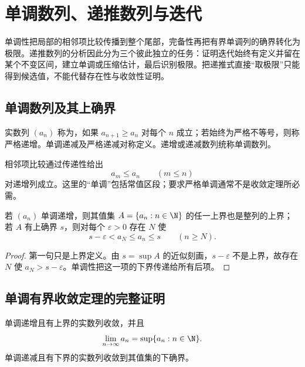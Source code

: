 \chapter{单调数列、递推数列与迭代}
\label{chap:monotone-recursive-sequences}

\begin{chapterguide}
单调性把局部的相邻项比较传播到整个尾部，完备性再把有界单调列的确界转化为极限。递推数列的分析因此分为三个彼此独立的任务：证明迭代始终有定义并留在某个不变区间，建立单调或压缩估计，最后识别极限。把递推式直接“取极限”只能得到候选值，不能代替存在性与收敛性证明。
\end{chapterguide}

\section{单调数列及其上确界}

\begin{definition}
实数列 \((a_n)\) 称为，如果 \(a_{n+1}\ge a_n\) 对每个 \(n\) 成立；若始终为严格不等号，则称严格递增。单调递减及严格递减对称定义。递增或递减数列统称单调数列。
\end{definition}

相邻项比较通过传递性给出
\[
 a_m\le a_n\qquad(m\le n)
\]
对递增列成立。这里的“单调”包括常值区段；要求严格单调通常不是收敛定理所必需。

\begin{proposition}
若 \((a_n)\) 单调递增，则其值集 \(A=\{a_n:n\in\N\}\) 的任一上界也是整列的上界；若 \(A\) 有上确界 \(s\)，则对每个 \(\varepsilon>0\) 存在 \(N\) 使
\[
 s-\varepsilon<a_N\le a_n\le s\qquad(n\ge N).
\]
\end{proposition}

\begin{proof}
第一句只是上界定义。由 \(s=\sup A\) 的近似刻画，\(s-\varepsilon\) 不是上界，故存在 \(N\) 使 \(a_N>s-\varepsilon\)。单调性把这一项的下界传递给所有后项。
\end{proof}

\section{单调有界收敛定理的完整证明}

\begin{theorem}[单调有界收敛定理]
单调递增且有上界的实数列收敛，并且
\[
 \lim_{n\to\infty}a_n=\sup\{a_n:n\in\N\}.
\]
单调递减且有下界的实数列收敛到其值集的下确界。
\end{theorem}


